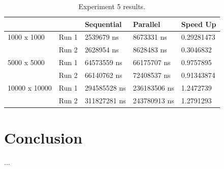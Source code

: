 \documentclass[conference]{IEEEtran}
\begin{document}
\begin{table}[]
\caption{Experiment 5 results.}
\label{tab:table5}
\begin{tabular}{|l|l|l|l|l|}
\hline
              &       & Sequential   & Parallel     & Speed Up   \\ \hline
1000 x 1000   & Run 1 & 2539679 ns   & 8673331 ns   & 0.29281473 \\ \hline
              & Run 2 & 2628954 ns   & 8628483 ns   & 0.3046832  \\ \hline
5000 x 5000   & Run 1 & 64573559 ns  & 66175707 ns  & 0.9757895  \\ \hline
              & Run 2 & 66140762 ns  & 72408537 ns  & 0.91343874 \\ \hline
10000 x 10000 & Run 1 & 294585528 ns & 236183506 ns & 1.2472739  \\ \hline
              & Run 2 & 311827281 ns & 243780913 ns & 1.2791293  \\ \hline
\end{tabular}
\end{table}

\section{Conclusion}

...



\end{document}
